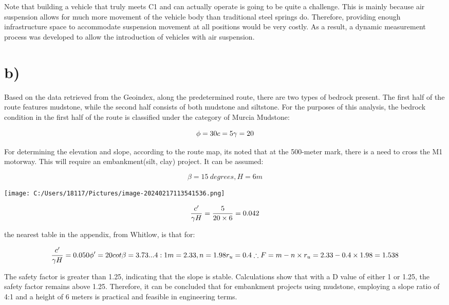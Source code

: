 \documentclass[
]{article}
\begin{document}
Note that building a vehicle that truly meets C1 and can actually
operate is going to be quite a challenge. This is mainly because air
suspension allows for much more movement of the vehicle body than
traditional steel springs do. Therefore, providing enough infrastructure
space to accommodate suspension movement at all positions would be very
costly. As a result, a dynamic measurement process was developed to
allow the introduction of vehicles with air suspension.

\section{b)}\label{b-2}

Based on the data retrieved from the Geoindex, along the predetermined
route, there are two types of bedrock present. The first half of the
route features mudstone, while the second half consists of both mudstone
and siltstone. For the purposes of this analysis, the bedrock condition
in the first half of the route is classified under the category of
Murcia Mudstone:

\[\phi=30\\

c=5\\

\gamma=20\]

For determining the elevation and slope, according to the route map,
it\textquotesingle s noted that at the 500-meter mark, there is a need
to cross the M1 motorway. This will require an embankment(silt, clay)
project. It can be assumed:

\[\beta = 15\ degrees,H = 6m\]

\texttt{[image: C:/Users/18117/Pictures/image-20240217113541536.png]}

\[\frac{c'}{\gamma H} = \frac{5}{20 \times 6} = 0.042\\\]

the nearest table in the appendix, from Whitlow, is that for:

\[\frac{c'}{\gamma H}=0.050\\

\phi' = 20\\

cot\beta=3.73...4:1\\

m=2.33,n=1.98\\

r_u=0.4\\

\therefore  F = m-n\times r_u =2.33-0.4\times1.98=1.538\]

The safety factor is greater than 1.25, indicating that the slope is
stable. Calculations show that with a D value of either 1 or 1.25, the
safety factor remains above 1.25. Therefore, it can be concluded that
for embankment projects using mudstone, employing a slope ratio of 4:1
and a height of 6 meters is practical and feasible in engineering terms.
\end{document}
